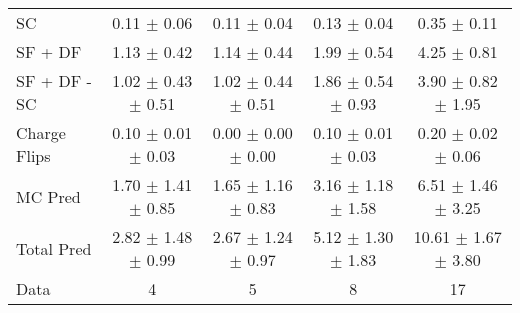 \begin{tabular}{l|cccc}
                                 SC &  0.11 $\pm$  0.06 &  0.11 $\pm$  0.04 &  0.13 $\pm$  0.04 &  0.35 $\pm$  0.11 \\
                            SF + DF &  1.13 $\pm$  0.42 &  1.14 $\pm$  0.44 &  1.99 $\pm$  0.54 &  4.25 $\pm$  0.81 \\
\hline
                       SF + DF - SC &  1.02 $\pm$  0.43 $\pm$  0.51 &  1.02 $\pm$  0.44 $\pm$  0.51 &  1.86 $\pm$  0.54 $\pm$  0.93 &  3.90 $\pm$  0.82 $\pm$  1.95 \\
\hline\hline
                       Charge Flips &  0.10 $\pm$  0.01 $\pm$  0.03 &  0.00 $\pm$  0.00 $\pm$  0.00 &  0.10 $\pm$  0.01 $\pm$  0.03 &  0.20 $\pm$  0.02 $\pm$  0.06 \\
\hline
                            MC Pred &  1.70 $\pm$  1.41 $\pm$  0.85 &  1.65 $\pm$  1.16 $\pm$  0.83 &  3.16 $\pm$  1.18 $\pm$  1.58 &  6.51 $\pm$  1.46 $\pm$  3.25 \\
\hline
                         Total Pred &  2.82 $\pm$  1.48 $\pm$  0.99 &  2.67 $\pm$  1.24 $\pm$  0.97 &  5.12 $\pm$  1.30 $\pm$  1.83 & 10.61 $\pm$  1.67 $\pm$  3.80 \\
\hline\hline
                               Data &     4 &     5 &     8 &    17 \\
\hline\hline
\end{tabular}

